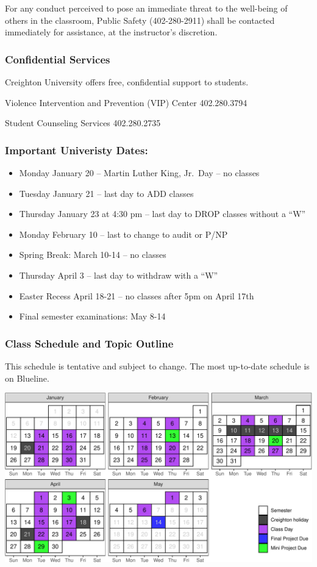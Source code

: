 \documentclass[
  11pt,
  letterpaper,
  DIV=11,
  numbers=noendperiod]{scrartcl}
\providecommand{\tightlist}{%
  \setlength{\itemsep}{0pt}\setlength{\parskip}{0pt}}\usepackage{longtable,booktabs,array}
\begin{document}
For any conduct perceived to pose an immediate threat to the well-being
of others in the classroom, Public Safety (402-280-2911) shall be
contacted immediately for assistance, at the instructor's discretion.

\subsubsection{Confidential Services}\label{confidential-services}

Creighton University offers free, confidential support to students.

Violence Intervention and Prevention (VIP) Center 402.280.3794

Student Counseling Services 402.280.2735

\subsubsection{Important Univeristy
Dates:}\label{important-univeristy-dates}

\begin{itemize}
\tightlist
\item
  Monday January 20 -- Martin Luther King, Jr.~Day -- no classes
\item
  Tuesday January 21 -- last day to ADD classes
\item
  Thursday January 23 at 4:30 pm -- last day to DROP classes without a
  ``W''
\item
  Monday February 10 -- last to change to audit or P/NP
\item
  Spring Break: March 10-14 -- no classes
\item
  Thursday April 3 -- last day to withdraw with a ``W''
\item
  Easter Recess April 18-21 -- no classes after 5pm on April 17th
\item
  Final semester examinations: May 8-14
\end{itemize}

\newpage

\subsubsection{Class Schedule and Topic
Outline}\label{class-schedule-and-topic-outline}

This schedule is tentative and subject to change. The most up-to-date
schedule is on Blueline.

\includegraphics{figs/calendar.pdf}
\end{document}

